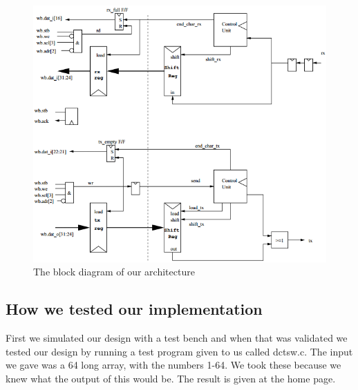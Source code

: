 \documentclass[a4paper]{article}
\begin{document}
\begin{figure}[h]
\centering
\includegraphics[scale=0.5]{blockdiagram.png}
\caption{The block diagram of our architecture}
\label{fig:block diagram}
\end{figure}

\subsection{How we tested our implementation}

First we simulated our design with a test bench and when that was
validated we tested our design by running a test program given to us
called dctsw.c. The input we gave was a 64 long array, with the numbers
1-64. We took these because we knew what the output of this would be.
The result is given at the home page.
\end{document}
